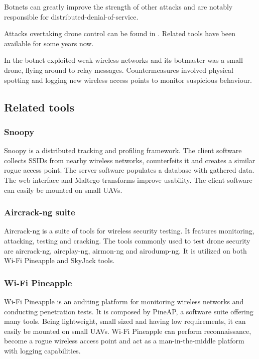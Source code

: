 \documentclass[journal]{IEEEtran}
\begin{document}
Botnets can greatly improve the strength of other attacks and are notably responsible for distributed-denial-of-service.

Attacks overtaking drone control can be found in \cite{uavvulnerabilitiesreview} \cite{publicsafetynetworksecurity} \cite{smartcitiesdronesecurity} \cite{accessvulnerabilities} \cite{exploringuavvulnerabilities} \cite{stealthyrop}. Related tools \cite{wifipineapple} \cite{aircrackng} \cite{skyjack} have been available for some years now.

In \cite{skynet} the botnet exploited weak wireless networks and its botmaster was a small drone, flying around to relay messages. Countermeasures involved physical spotting and logging new wireless access points to monitor suspicious behaviour.

\subsection{Related tools}

\subsubsection{Snoopy}
Snoopy \cite{snoopy} is a distributed tracking and profiling framework. The client software collects SSIDs from nearby wireless networks, counterfeits it and creates a similar rogue access point. The server software populates a database with gathered data. The web interface and Maltego transforms improve usability. The client software can easily be mounted on small UAVs.

\subsubsection{Aircrack-ng suite}
Aircrack-ng \cite{aircrackng} is a suite of tools for wireless security testing. It features monitoring, attacking, testing and cracking. The tools commonly used to test drone security are aircrack-ng, aireplay-ng, airmon-ng and airodump-ng. It is utilized on both Wi-Fi Pineapple and SkyJack tools.

\subsubsection{Wi-Fi Pineapple}
Wi-Fi Pineapple \cite{wifipineapple} is an auditing platform for monitoring wireless networks and conducting penetration tests. It is composed by PineAP, a software suite offering many tools. Being lightweight, small sized and having low requirements, it can easily be mounted on small UAVs. Wi-Fi Pineapple can perform reconnaissance, become a rogue wireless access point and act as a man-in-the-middle platform with logging capabilities.
\end{document}
